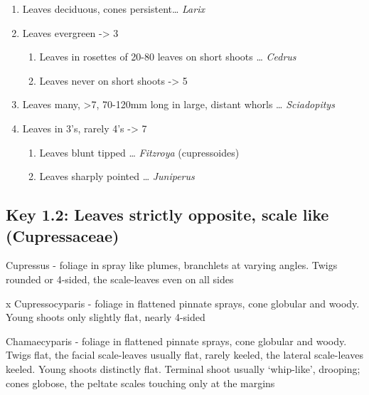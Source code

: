 \documentclass[openany]{book}
\providecommand{\tightlist}{%
  \setlength{\itemsep}{0pt}\setlength{\parskip}{0pt}}
\begin{document}
\begin{enumerate}
\def\labelenumi{\arabic{enumi}.}
\tightlist
\item
  Leaves deciduous, cones persistent\ldots{} \emph{Larix}
\item
  Leaves evergreen -\textgreater{} 3

  \begin{enumerate}
  \def\labelenumii{\arabic{enumii}.}
  \setcounter{enumii}{2}
  \tightlist
  \item
    Leaves in rosettes of 20-80 leaves on short shoots \ldots{}
    \emph{Cedrus}
  \item
    Leaves never on short shoots -\textgreater{} 5
  \end{enumerate}
\item
  Leaves many, \textgreater{}7, 70-120mm long in large, distant whorls
  \ldots{} \emph{Sciadopitys}
\item
  Leaves in 3's, rarely 4's -\textgreater{} 7

  \begin{enumerate}
  \def\labelenumii{\arabic{enumii}.}
  \setcounter{enumii}{6}
  \tightlist
  \item
    Leaves blunt tipped \ldots{} \emph{Fitzroya} (cupressoides)
  \item
    Leaves sharply pointed \ldots{} \emph{Juniperus}
  \end{enumerate}
\end{enumerate}

\hypertarget{key-1.2-leaves-strictly-opposite-scale-like-cupressaceae-1}{%
\subsection{Key 1.2: Leaves strictly opposite, scale like
(Cupressaceae)}\label{key-1.2-leaves-strictly-opposite-scale-like-cupressaceae-1}}

Cupressus - foliage in spray like plumes, branchlets at varying angles.
Twigs rounded or 4-sided, the scale-leaves even on all sides

x Cupressocyparis - foliage in flattened pinnate sprays, cone globular
and woody. Young shoots only slightly flat, nearly 4-sided

Chamaecyparis - foliage in flattened pinnate sprays, cone globular and
woody. Twigs flat, the facial scale-leaves usually flat, rarely keeled,
the lateral scale-leaves keeled. Young shoots distinctly flat. Terminal
shoot usually `whip-like', drooping; cones globose, the peltate scales
touching only at the margins
\end{document}
